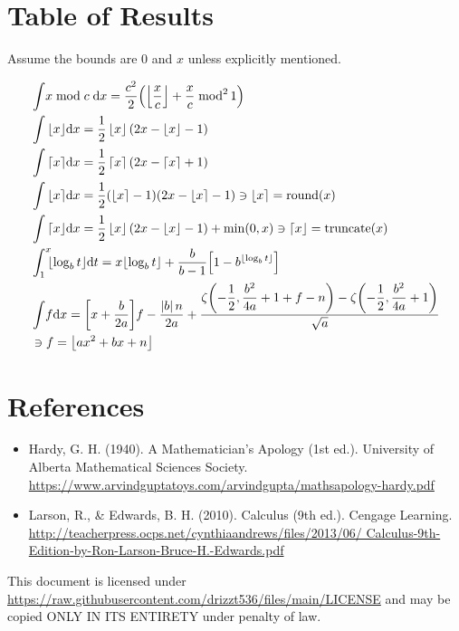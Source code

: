 \documentclass[12pt]{article}
\newcommand \floor [1]{\left\lfloor #1 \right\rfloor}
\newcommand \ceil [1]{ \left\lceil  #1 \right\rceil}
\newcommand \round [1]{\left\lfloor #1 \right\rceil}
\newcommand \trunc [1]{\left\lceil  #1 \right\rfloor}
\newcommand \pgrp [1]{\left( #1 \right)}   %
\newcommand \bgrp [1]{\left[ #1 \right]}   %
\newcommand \abs [1]{\left| #1 \right|}
\newcommand \dx {\df x}
\newcommand \dt {\df t}
\newcommand \df [1]{\mathrm d #1}
\begin{document}
{}
\section*{Table of Results}

	\indent\indent Assume the bounds are $0$ and $x$ unless explicitly mentioned.

	\begin{minipage}{\textwidth}
		\centering
		\begin{align}
			& \int \! x \bmod c\; \dx = \dfrac{c^2}2\!\pgrp{\floor{\dfrac xc}+
										\dfrac xc\;\mathrm{mod}^2\,1}\\
			& \int \floor x\!\dx = \dfrac12\floor x(2x-\floor x-1)\\
			& \int \ceil  x\!\dx = \dfrac12\ceil x(2x-\ceil x+1)\\
			& \int \round x\!\dx = \dfrac12(\round x-1)(2x-\round x-1)\ni\round x=
								\mathrm{round}(x)\\
			& \int \trunc x\!\dx = \dfrac12\floor x(2x - \floor x - 1) + \min(0,x) \ni\trunc x =
								\mathrm{truncate}(x)\\
			& \int_1^x \!\!\!\floor{\log_b t}\!\dt = x \!\floor{\log_b t} + \dfrac b{b-1}\!
												\bgrp{1 - b^{\floor{\log_b t}}} \\
			& \int \!f \dx = \bgrp{x+\dfrac b{2a}}\!f-\dfrac{\abs bn}{2a}+\dfrac{\zeta\!\pgrp{-
							\dfrac12,\dfrac{b^2}{4a}+1+f-n}-\zeta\!\pgrp{-\dfrac12,\dfrac{b^2}{4a}
							+1}}{\sqrt a}\\
			& \ni f = \floor{ax^2 + bx + n} \notag
		\end{align}
	\end{minipage}

{}
\section*{References}

	\begin{itemize}
		\item Hardy, G. H. (1940). A Mathematician's Apology (1st ed.). University of Alberta
			Mathematical Sciences Society.\\
			\url{https://www.arvindguptatoys.com/arvindgupta/mathsapology-hardy.pdf}\\

		\item Larson, R., \& Edwards, B. H. (2010). Calculus (9th ed.). Cengage Learning.\\
			\url{http://teacherpress.ocps.net/cynthiaandrews/files/2013/06/
			Calculus-9th-Edition-by-Ron-Larson-Bruce-H.-Edwards.pdf}
	\end{itemize}
	\vfill
	This document is licensed under
	\url{https://raw.githubusercontent.com/drizzt536/files/main/LICENSE}
	and may be copied ONLY IN ITS ENTIRETY under penalty of law.
	\vspace{0.5em}
\end{document}
